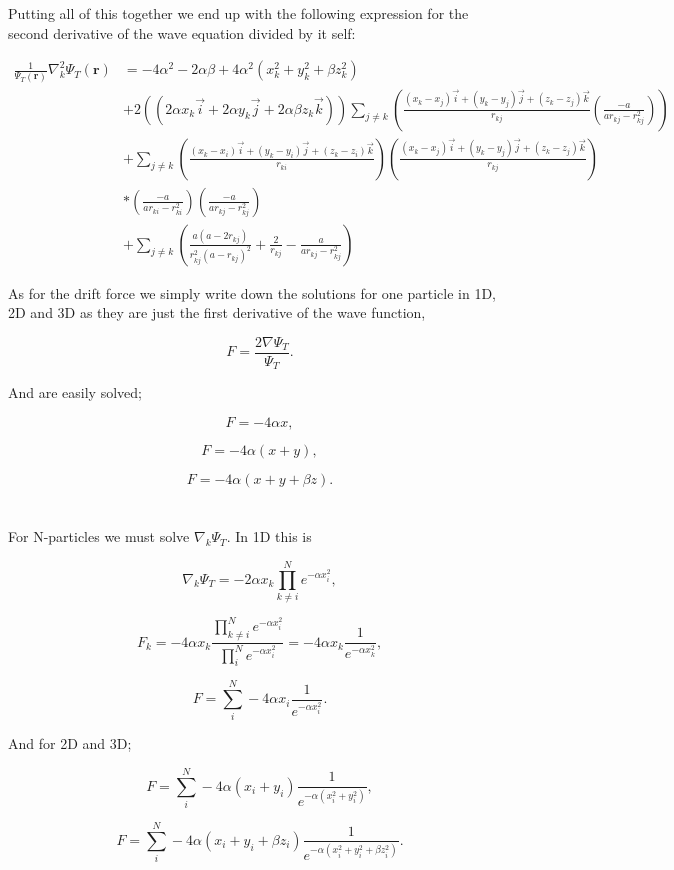 Putting all of this together we end up with the following expression for the second derivative of the wave equation divided by it self:

\begin{align*}
\frac{1}{\Psi_T(\mathbf{r})}\nabla_k^2 \Psi_T(\mathbf{r}) &= -4\alpha^2 - 2\alpha \beta + 4\alpha^2(x_k^2 + y_k^2 + \beta z_k^2) \\
&+ 2((2\alpha x_k \vec{i} + 2\alpha y_k \vec{j} + 2\alpha \beta z_k \vec{k})) \sum_{j \ne k} \left( \frac{(x_k - x_j)\vec{i} + (y_k - y_j)\vec{j} + (z_k - z_j)\vec{k}}{r_{kj}} \left( \frac{-a}{ar_{kj} - r_{kj}^2} \right) \right)\\
&+ \sum_{j \ne k} \left( \frac{(x_k - x_i)\vec{i} + (y_k - y_i)\vec{j} + (z_k - z_i)\vec{k}}{r_{ki}} \right) \left( \frac{(x_k - x_j)\vec{i} + (y_k - y_j)\vec{j} + (z_k - z_j)\vec{k}}{r_{kj}} \right) \\
&* \left( \frac{-a}{ar_{ki} - r_{ki}^2} \right) \left( \frac{-a}{ar_{kj} - r_{kj}^2} \right)\\
&+ \sum_{j \ne k} \left( \frac{a(a - 2r_{kj})}{r_{kj}^2(a - r_{kj})^2} + \frac{2}{r_{kj}} - \frac{a}{ar_{kj} - r_{kj}^2}\right)
\end{align*}

As for the drift force we simply write down the solutions for one particle in 1D, 2D and 3D as they are just the first derivative of the wave function,

$$F = \frac{2 \nabla \Psi_T}{\Psi_T}.$$

And are easily solved;

$$F = -4 \alpha x,$$

$$F = -4 \alpha (x + y),$$

$$F = -4 \alpha (x + y + \beta z).$$
\\
\\
For N-particles we must solve $\nabla_k \Psi_T$. In 1D this is

$$\nabla_k \Psi_T = -2 \alpha x_k \prod_{k \ne i}^N e^{-\alpha x_i^2},$$

$$F_k = -4\alpha x_k \frac{\prod_{k \ne i}^N e^{-\alpha x_i^2}}{\prod_{i}^N e^{-\alpha x_i^2}} = -4\alpha x_k \frac{1}{e^{-\alpha x_k^2}},$$

$$F = \sum_i^N -4\alpha x_i \frac{1}{e^{-\alpha x_i^2}}.$$

And for 2D and 3D; 

$$F = \sum_i^N -4\alpha (x_i + y_i) \frac{1}{e^{-\alpha (x_i^2 + y_i^2)}},$$

$$F = \sum_i^N -4\alpha (x_i + y_i + \beta z_i) \frac{1}{e^{-\alpha (x_i^2 + y_i^2 + \beta z_i^2)}}.$$

